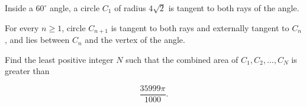 Inside a $60^\circ$ angle, a circle $C_1$ of radius $4\sqrt2$ is tangent to both rays of the angle.

For every $n\ge1$, circle $C_{n+1}$ is tangent to both rays and externally tangent to $C_n$, and lies between $C_n$ and the vertex of the angle.

Find the least positive integer $N$ such that the combined area of $C_1,C_2,\ldots,C_N$ is greater than

\[
\dfrac{35999\pi}{1000}.
\]
